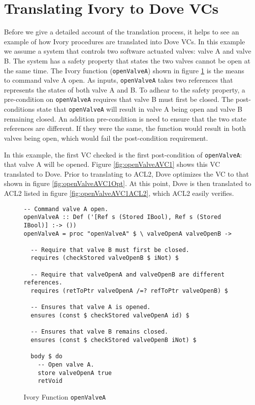 \documentclass{article}
\begin{document}
\section{Translating Ivory to Dove VCs}

Before we give a detailed account of the translation process, it helps to see an 
example of how Ivory procedures are translated into Dove VCs.
In this example we assume a system that
controls two software actuated valves: valve A and valve B.
The system has a safety property that states the two valves cannot be open
at the same time.  The Ivory function (\texttt{openValveA})
shown in figure \ref{fig:openValveA} is the means to command valve A open.
As inputs, \texttt{openValveA} takes two references that
represents the states of both valve A and B.
To adhear to the safety property, a pre-condition on \texttt{openValveA}
requires that valve B must first be closed.  The post-conditions state
that \texttt{openValveA} will result in valve A being open and valve B remaining closed.
An addition pre-condition is need to ensure that the two state references
are different.
If they were the same, the function would result in both valves being open,
which would fail the post-condition requirement.

In this example, the first VC checked is the first post-condition
of \texttt{openValveA}: that valve A will be opened.
Figure \ref{fig:openValveAVC1} shows this VC translated to Dove.
Prior to translating to ACL2, Dove optimizes the VC
to that shown in figure \ref{fig:openValveAVC1Opt}.
At this point, Dove is then translated to ACL2 listed
in figure \ref{fig:openValveAVC1ACL2}, which ACL2 easily verifies.

\begin{figure} 
  \caption{Ivory Function \texttt{openValveA}}
  \label{fig:openValveA}
  \begin{lstlisting}
-- Command valve A open.
openValveA :: Def ('[Ref s (Stored IBool), Ref s (Stored IBool)] :-> ())
openValveA = proc "openValveA" $ \ valveOpenA valveOpenB ->

  -- Require that valve B must first be closed.
  requires (checkStored valveOpenB $ iNot) $

  -- Require that valveOpenA and valveOpenB are different references.
  requires (retToPtr valveOpenA /=? refToPtr valveOpenB) $

  -- Ensures that valve A is opened.
  ensures (const $ checkStored valveOpenA id) $

  -- Ensures that valve B remains closed.
  ensures (const $ checkStored valveOpenB iNot) $

  body $ do
    -- Open valve A.
    store valveOpenA true
    retVoid
  \end{lstlisting}
\end{figure}
\end{document}
